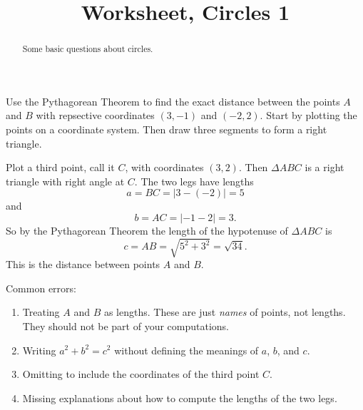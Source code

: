 \documentclass{ximera}
\title{Worksheet, Circles 1}
\begin{document}
\begin{abstract}
Some basic questions about circles.
\end{abstract}
\maketitle


\begin{question}\label{Qpf3m390}
Use the Pythagorean Theorem to find the exact distance between the points $A$ and $B$ with repsective coordinates $(3,-1)$ and $(-2,2)$. Start by plotting the points on a coordinate system. Then draw three segments to form a right triangle.

\begin{explanation}
Plot a third point, call it $C$, with coordinates $(3,2)$. Then $\Delta ABC$ is a right triangle with right angle at $C$. The two legs have lengths
\[
     a = BC = |3 - (-2)| = 5
\]
and
\[
     b = AC = | -1 - 2| = 3. 
\]
So by the Pythagorean Theorem the length of the hypotenuse of $\Delta ABC$ is
\[
 c = AB = \sqrt{5^2 + 3^2} = \sqrt{34}.
\]
This is the distance between points $A$ and $B$.

Common errors:
\begin{enumerate}
\item Treating $A$ and $B$ as lengths. These are just \emph{names} of points, not lengths. They should not be part of  your computations.

\item Writing $a^2 + b^2 = c^2$ without defining the meanings of $a$, $b$, and $c$.

\item Omitting to include the coordinates of the third point $C$.

\item Missing explanations about how to compute the lengths of the two legs.

\end{enumerate}



\end{explanation}
\end{question} \label{Qkf31222}
\end{document}
